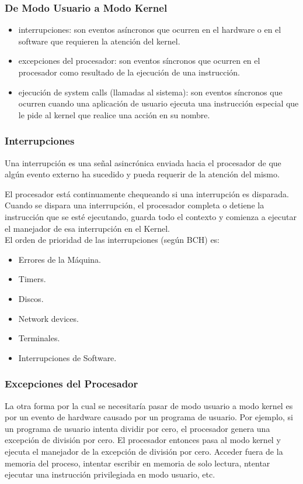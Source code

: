 \documentclass[../main.tex]{subfiles}
\begin{document}
        \subsubsection*{De Modo Usuario a Modo Kernel}
            \begin{itemize}
                \item interrupciones: son eventos asíncronos que ocurren en el hardware o en el software que requieren la atención del kernel.
                \item excepciones del procesador: son eventos síncronos que ocurren en el procesador como resultado de la ejecución de una instrucción.
                \item ejecución de system calls (llamadas al sistema): son eventos síncronos que ocurren cuando una aplicación de usuario ejecuta una instrucción especial que le pide al kernel que realice una acción en su nombre.
            \end{itemize}
        
        \subsubsection*{Interrupciones}
            Una interrupción es una señal asincrónica enviada hacia el procesador de que algún evento externo ha sucedido y pueda requerir de la atención del mismo.

            El procesador está continuamente chequeando si una interrupción es disparada. Cuando se dispara una interrupción, el procesador completa o detiene la instrucción que se esté ejecutando, guarda todo el contexto y comienza a ejecutar el manejador de esa interrupción en el Kernel.\\
            
            El orden de prioridad de las interrupciones (según BCH) es:

            \begin{itemize}
                \item Errores de la Máquina.
                \item Timers.
                \item Discos.
                \item Network devices.
                \item Terminales.
                \item Interrupciones de Software.
            \end{itemize}

        \subsubsection*{Excepciones del Procesador}
            La otra forma por la cual se necesitaría pasar de modo usuario a modo kernel es por un evento de hardware causado por un programa de usuario. Por ejemplo, si un programa de usuario intenta dividir por cero, el procesador genera una excepción de división por cero. El procesador entonces pasa al modo kernel y ejecuta el manejador de la excepción de división por cero. Acceder fuera de la memoria del proceso, intentar escribir en memoria de solo lectura, ntentar ejecutar una instrucción privilegiada en modo usuario, etc.
\end{document}
